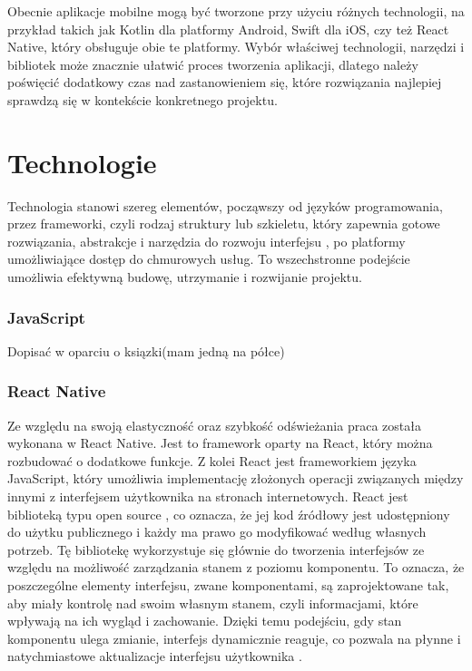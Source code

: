 Obecnie aplikacje mobilne mogą być tworzone przy użyciu różnych technologii, na
przykład takich jak Kotlin dla platformy Android, Swift dla iOS, czy też React Native, który
obsługuje obie te platformy. Wybór właściwej technologii, narzędzi i bibliotek może znacznie
ułatwić proces tworzenia aplikacji, dlatego należy poświęcić dodatkowy czas nad
zastanowieniem się, które rozwiązania najlepiej sprawdzą się w kontekście konkretnego
projektu.

\section*{Technologie}
Technologia stanowi szereg elementów, począwszy od języków programowania, przez
frameworki, czyli rodzaj struktury lub szkieletu, który zapewnia gotowe rozwiązania, abstrakcje i narzędzia do rozwoju interfejsu \cite{framework}, po platformy umożliwiające dostęp do chmurowych usług. To wszechstronne podejście umożliwia efektywną budowę, utrzymanie i rozwijanie projektu.
\subsubsection*{\textbf{JavaScript}}
Dopisać w oparciu o ksiązki(mam jedną na półce)

\subsubsection*{\textbf{React Native}}

Ze względu na swoją elastyczność oraz szybkość odświeżania praca została wykonana
w React Native. Jest to framework oparty na React, który można rozbudować o dodatkowe
funkcje. Z kolei React jest frameworkiem języka JavaScript, który umożliwia
implementację złożonych operacji związanych między innymi z interfejsem użytkownika na
stronach internetowych. React jest biblioteką typu open source \cite{opensource}, co oznacza, że jej kod
źródłowy jest udostępniony do użytku publicznego i każdy ma prawo go modyfikować według
własnych potrzeb. Tę bibliotekę wykorzystuje się głównie do tworzenia interfejsów ze względu na możliwość zarządzania stanem z poziomu komponentu. To oznacza, że poszczególne
elementy interfejsu, zwane komponentami, są zaprojektowane tak, aby miały kontrolę nad
swoim własnym stanem, czyli informacjami, które wpływają na ich wygląd i zachowanie. Dzięki temu podejściu, gdy stan komponentu ulega zmianie, interfejs dynamicznie reaguje, co pozwala na płynne i natychmiastowe aktualizacje interfejsu użytkownika \cite{javascripteverywhere}.

